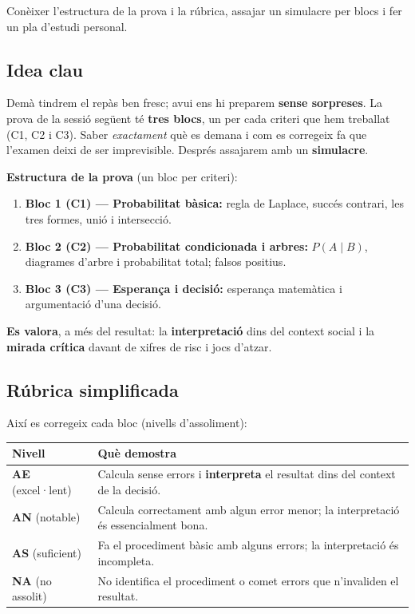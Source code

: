 %
{Conèixer l'estructura de la prova i la rúbrica, assajar un simulacre per blocs i fer un pla d'estudi personal.}

\subsection{Idea clau}

Demà tindrem el repàs ben fresc; avui ens hi preparem \textbf{sense sorpreses}. La prova
de la sessió següent té \textbf{tres blocs}, un per cada criteri que hem treballat (C1,
C2 i C3). Saber \emph{exactament} què es demana i com es corregeix fa que l'examen deixi
de ser imprevisible. Després assajarem amb un \textbf{simulacre}.

\begin{idea}
\textbf{Estructura de la prova} (un bloc per criteri):
\begin{enumerate}[leftmargin=1.6em, itemsep=2pt]
  \item \textbf{Bloc 1 (C1) — Probabilitat bàsica:} regla de Laplace, succés contrari,
        les tres formes, unió i intersecció.
  \item \textbf{Bloc 2 (C2) — Probabilitat condicionada i arbres:} $P(A\mid B)$,
        diagrames d'arbre i probabilitat total; falsos positius.
  \item \textbf{Bloc 3 (C3) — Esperança i decisió:} esperança matemàtica i argumentació
        d'una decisió.
\end{enumerate}
\textbf{Es valora}, a més del resultat: la \textbf{interpretació} dins del context
social i la \textbf{mirada crítica} davant de xifres de risc i jocs d'atzar.
\end{idea}

\subsection{Rúbrica simplificada}

\noindent Així es corregeix cada bloc (nivells d'assoliment):
\begin{center}
\renewcommand{\arraystretch}{1.3}
\begin{tabular}{p{2.4cm} p{10.2cm}}
\toprule
\textbf{Nivell} & \textbf{Què demostra} \\
\midrule
\textbf{AE} (excel·lent) & Calcula sense errors i \textbf{interpreta} el resultat dins
del context de la decisió. \\
\textbf{AN} (notable) & Calcula correctament amb algun error menor; la interpretació és
essencialment bona. \\
\textbf{AS} (suficient) & Fa el procediment bàsic amb alguns errors; la interpretació
és incompleta. \\
\textbf{NA} (no assolit) & No identifica el procediment o comet errors que
n'invaliden el resultat. \\
\bottomrule
\end{tabular}
\end{center}

